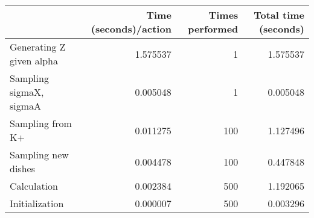 \begin{tabular}{lrrr}
\toprule
{} &  Time (seconds)/action &  Times performed &  Total time (seconds) \\
\midrule
Generating Z given alpha &               1.575537 &                1 &              1.575537 \\
Sampling sigmaX, sigmaA  &               0.005048 &                1 &              0.005048 \\
Sampling from K+         &               0.011275 &              100 &              1.127496 \\
Sampling new dishes      &               0.004478 &              100 &              0.447848 \\
Calculation              &               0.002384 &              500 &              1.192065 \\
Initialization           &               0.000007 &              500 &              0.003296 \\
\bottomrule
\end{tabular}
